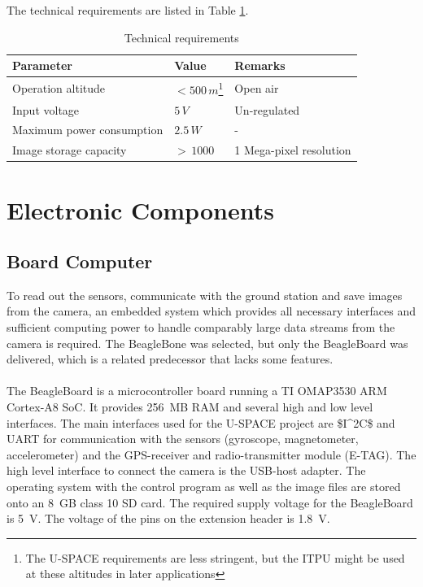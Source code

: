 \noindent
The technical requirements are listed in Table \ref{tab:technical}.

\begin{table}[H]
\centering
\caption{Technical requirements}
\label{tab:technical}
\begin{minipage}{\textwidth}
\begin{tabular}{p{}p{}p{}}
\hline
\textbf{Parameter} & \textbf{Value} & \textbf{Remarks}\\ \hline
Operation altitude & $< 500\,m$\footnote{The \ac{U-SPACE} requirements are less stringent, but the \ac{ITPU} might be used at these altitudes in later applications} & Open air\\
Input voltage & $5\,V$ & Un-regulated\\
Maximum power consumption  & $2.5\,W$ & -\\
Image storage capacity & $>\,1000$ & 1 Mega-pixel resolution\\
\hline
\end{tabular}\par
\vspace{-0.75\skip\footins}
\renewcommand{\footnoterule}{}
\end{minipage}
\vspace{-1.0em}
\end{table}

\section{Electronic Components}

\subsection{Board Computer}

To read out the sensors, communicate with the ground station and save images from the camera, an embedded system which provides all necessary interfaces and sufficient computing power to handle comparably large data streams from the camera is required. The BeagleBone \cite{website:beaglebone, BeagleBone:SRM} was selected, but only the BeagleBoard \cite{website:beagleboard} was delivered, which is a related predecessor that lacks some features.
\\
\\
The BeagleBoard is a microcontroller board running a TI OMAP3530 ARM Cortex-A8 \ac{SoC}. It provides 256~MB RAM and several high and low level interfaces. The main interfaces used for the \ac{U-SPACE} project are \ac{$I^2C$} and \ac{UART} for communication with the sensors (gyroscope, magnetometer, accelerometer) and the \ac{GPS}-receiver and radio-transmitter module (E-TAG). The high level interface to connect the camera is the \ac{USB}-host adapter. The operating system with the control program as well as the image files are stored onto an 8~GB class 10 \ac{SD} card. The required supply voltage for the BeagleBoard is 5~V. The voltage of the pins on the extension header is 1.8~V.

